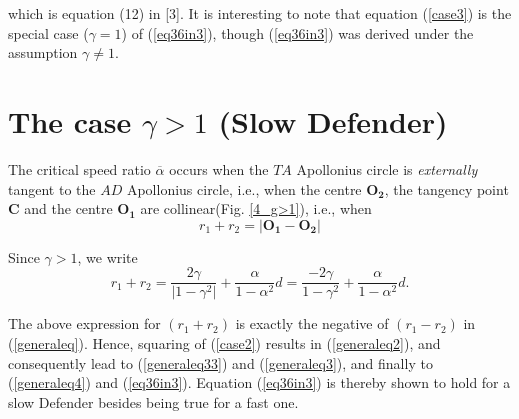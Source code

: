 which is equation (12) in [3]. It is interesting to note that equation (\ref{case3}) is the special case ($\gamma=1$) of (\ref{eq36in3}), 
though (\ref{eq36in3}) was derived under the assumption $\gamma\neq1$.




\section{The case $\gamma>1$ (Slow Defender)}
The critical speed ratio $\overline{\alpha}$ occurs when the $TA$ Apollonius circle is \textit{externally} tangent to the $AD$ Apollonius circle, i.e., when the centre $\boldsymbol{O_{2}}$, the tangency point $\boldsymbol{C}$ and the centre $\boldsymbol{O_{1}}$ are collinear(Fig. \ref{4_g>1}), i.e., when 
\begin{equation}
r_{1}+r_{2}=\lvert\boldsymbol{O_{1}}-\boldsymbol{O_{2}}\rvert
\label{case2}
\end{equation}      

Since $\gamma>1$, we write
\begin{equation}
r_{1}+r_{2}=\dfrac{2\gamma}{\lvert1-\gamma^{2}\rvert}+\dfrac{\alpha}{1-\alpha^{2}}d=\dfrac{-2 \gamma}{1-\gamma^{2}}+\dfrac{\alpha}{1-\alpha^{2}}d.
\end{equation}

The above expression for $(r_1+r_2)$ is exactly the negative of $(r_1-r_2)$ in (\ref{generaleq}).
Hence, squaring of (\ref{case2}) results in (\ref{generaleq2}), and consequently lead to (\ref{generaleq33}) and (\ref{generaleq3}), and finally to (\ref{generaleq4}) and (\ref{eq36in3}).
Equation (\ref{eq36in3}) is thereby shown to hold for a slow Defender besides being true for a fast one.

